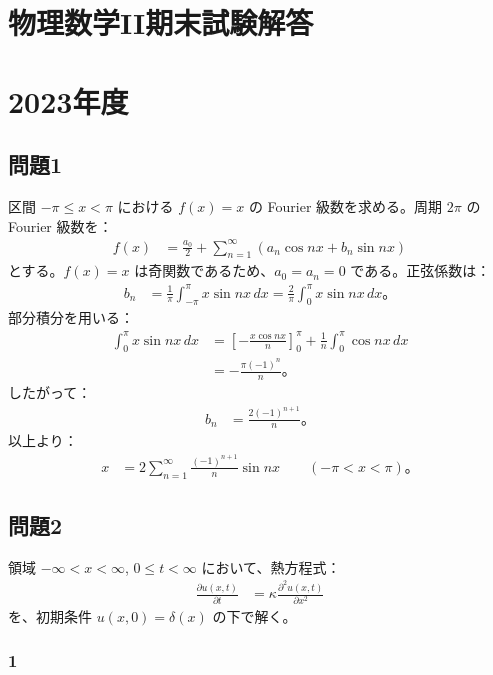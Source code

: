 \documentclass[platex,dvipdfmx,a4paper]{jsarticle}
\newcommand{\hb}[2]{\frac{\partial #1}{\partial #2}}
\newcommand{\nhb}[3]{\frac{\partial^{#1} #2}{\partial #3^{#1}}}
\begin{document}
\section*{物理数学II期末試験解答}

\section*{2023年度}

\subsection*{問題1}

区間 $-\pi\leq x<\pi$ における $f(x)=x$ の Fourier 級数を求める。周期 $2\pi$ の Fourier 級数を：
\begin{align*}
  f(x)
  &=\frac{a_0}{2}+\sum_{n=1}^{\infty}\left(a_n\cos nx+b_n\sin nx\right)
\end{align*}
とする。$f(x)=x$ は奇関数であるため、$a_0=a_n=0$ である。正弦係数は：
\begin{align*}
  b_n
  &=\frac{1}{\pi}\int_{-\pi}^{\pi}x\sin nx\,dx
   =\frac{2}{\pi}\int_0^\pi x\sin nx\,dx。
\end{align*}
部分積分を用いる：
\begin{align*}
  \int_0^\pi x\sin nx\,dx
  &=\left[-\frac{x\cos nx}{n}\right]_0^\pi
    +\frac{1}{n}\int_0^\pi\cos nx\,dx \\
  &=-\frac{\pi(-1)^n}{n}。
\end{align*}
したがって：
\begin{align*}
  b_n
  &=\frac{2(-1)^{n+1}}{n}。
\end{align*}
以上より：
\begin{align*}
  x
  &=2\sum_{n=1}^{\infty}\frac{(-1)^{n+1}}{n}\sin nx
  \qquad (-\pi<x<\pi)。
\end{align*}

\subsection*{問題2}

領域 $-\infty<x<\infty$, $0\leq t<\infty$ において、熱方程式：
\begin{align*}
  \hb{u(x,t)}{t}
  &=\kappa\nhb{2}{u(x,t)}{x}
\end{align*}
を、初期条件 $u(x,0)=\delta(x)$ の下で解く。

\subsubsection*{1}
\end{document}
